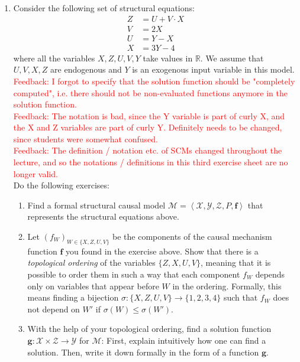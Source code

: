 \begin{enumerate}
	\item Consider the following set of structural equations:
	\begin{align}
		Z & = U + V \cdot X \\
		V & = 2 X           \\
		U & = Y - X         \\
		X & = 3 Y - 4
		\label{eq:acyclic_structural_equations}
	\end{align}
	where all the variables $X, Z, U, V, Y$ take values in $\mathbb{R}$.
	We assume that $U,V,X,Z$ are endogenous and $Y$ is an exogenous input variable in this model.\\
	\textcolor{red}{Feedback: I forgot to specify that the solution function should be "completely computed", i.e. there should not be non-evaluated functions anymore in the solution function.}\\
	\textcolor{red}{Feedback: The notation is bad, since the Y variable is part of curly X, and the X and Z variables are part of curly Y. Definitely needs to be changed, since students were somewhat confused.}\\
	\textcolor{red}{Feedback: The definition / notation etc. of SCMs changed throughout the lecture, and so the notations / definitions in this third exercise sheet are no longer valid.}\\
	Do the following exercises:
	\begin{enumerate}
		\item Find a formal structural causal model $\mathcal{M} = \left\langle \boldsymbol{\mathcal{X}}, \boldsymbol{\mathcal{Y}}, \boldsymbol{\mathcal{Z}}, P, \boldsymbol{f}\right\rangle$ that represents the structural equations above.
		\item Let $(f_W)_{W \in \{X,Z,U,V\}}$ be the components of the causal mechanism function $\boldsymbol{f}$ you found in the exercise above.
		Show that there is a \emph{topological ordering} of the variables $\{Z,X,U,V\}$, meaning that it is possible to order them in such a way that each component $f_W$ depends only on variables that appear before $W$ in the ordering.
		Formally, this means finding a bijection $\sigma: \{X, Z, U, V\} \to \{1, 2, 3, 4\}$ such that $f_{W}$ does not depend on $W'$ if $\sigma(W) \leq \sigma(W')$.
		\item With the help of your topological ordering, find a solution function $\boldsymbol{g}: \boldsymbol{\mathcal{X}} \times \boldsymbol{\mathcal{Z}} \to \boldsymbol{\mathcal{Y}}$ for $\mathcal{M}$:
		First, explain intuitively how one can find a solution. Then, write it down formally in the form of a function $\boldsymbol{g}$.

\end{enumerate}
\end{enumerate}
